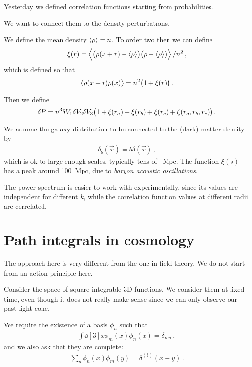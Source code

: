 \documentclass[main.tex]{subfiles}
\begin{document}

Yesterday we defined correlation functions starting from probabilities. 

We want to connect them to the density perturbations.

We define the mean density \(\expval{\rho } = n\). To order two then we can define 
%
\begin{align}
\xi (r) = \expval{\qty(\rho (x+r) - \expval{\rho }) \qty(\rho - \expval{\rho })} / n^2
\,,
\end{align}
%
which is defined so that 
%
\begin{align}
\expval{\rho (x +r) \rho (x)} = n^2 \qty(1 + \xi (r))
\,.
\end{align}

Then we define 
%
\begin{align}
\delta P = n^3 \delta V_1 \delta V_2 \delta V_3 \qty(1 + \xi (r_a)+ \xi (r_b) + \xi (r_c) + \zeta (r_a, r_b, r_c))
\,.
\end{align}

We assume the galaxy distribution to be connected to the (dark) matter density by  
%
\begin{align}
\delta_{g} (\vec{x}) = b \delta (\vec{x}) 
\,,
\end{align}
%
which is ok to large enough scales, typically tens of \SI{}{Mpc}.
The function \(\xi (s)\) has a peak around \SI{100}{Mpc}, due to \emph{baryon acoustic oscillations}.

The power spectrum is easier to work with experimentally, since its values are independent for different \(k\), while the correlation function values at different radii are correlated.

\section{Path integrals in cosmology}

The approach here is very different from the one in field theory. 
We do not start from an action principle here. 

Consider the space of square-integrable 3D functions. 
We consider them at fixed time, even though it does not really make sense since we can only observe our past light-cone. 

We require the existence of a basis \(\phi_{n}\) such that 
%
\begin{align}
\int \dd[3]{x} \phi_{m } (x) \phi_{n} (x) = \delta_{mn}
\,,
\end{align}
%
and we also ask that they are complete: 
%
\begin{align}
\sum _{n} \phi_{n} (x) \phi_{m} (y) = \delta^{(3)} (x-y)
\,.
\end{align}
\end{document}
